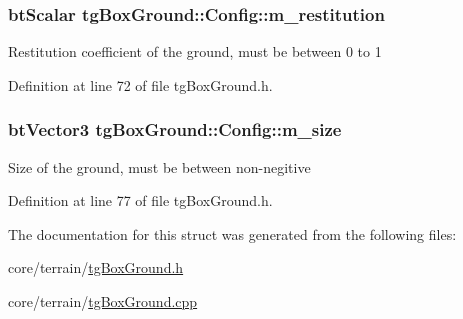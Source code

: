 \hypertarget{structtg_box_ground_1_1_config_ae8bceb792bc8c1b558e0ef7c12ec8332}{
\subsubsection[{m\-\_\-restitution}]{\setlength{\rightskip}{0pt plus 5cm}bt\-Scalar tg\-Box\-Ground\-::\-Config\-::m\-\_\-restitution}}\label{structtg_box_ground_1_1_config_ae8bceb792bc8c1b558e0ef7c12ec8332}
Restitution coefficient of the ground, must be between 0 to 1 

Definition at line 72 of file tg\-Box\-Ground.\-h.

\hypertarget{structtg_box_ground_1_1_config_a1873e1e4cc14f026e3df1ffb6c0c8156}{
\subsubsection[{m\-\_\-size}]{\setlength{\rightskip}{0pt plus 5cm}bt\-Vector3 tg\-Box\-Ground\-::\-Config\-::m\-\_\-size}}\label{structtg_box_ground_1_1_config_a1873e1e4cc14f026e3df1ffb6c0c8156}
Size of the ground, must be between non-\/negitive 

Definition at line 77 of file tg\-Box\-Ground.\-h.



The documentation for this struct was generated from the following files\-:\begin{DoxyCompactItemize}
\item 
core/terrain/\hyperlink{tg_box_ground_8h}{tg\-Box\-Ground.\-h}\item 
core/terrain/\hyperlink{tg_box_ground_8cpp}{tg\-Box\-Ground.\-cpp}\end{DoxyCompactItemize}
